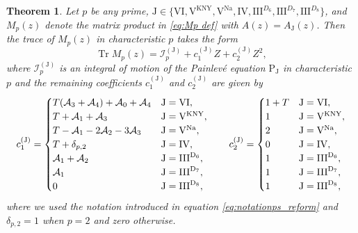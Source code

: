 \documentclass[a4paper,reqno]{amsart}
\numberwithin{equation}{section}
\newtheorem{theorem}{Theorem}[section]
\numberwithin{figure}{section}
\theoremstyle{remark}
\newcommand\PJ{\textrm{P}_{\textrm{J}}}
\begin{document}
\begin{theorem}\label{thm:gen trace}
Let $p$ be any prime, $\textrm{J}\in\{\textrm{VI},\textrm{V}^\text{KNY},\textrm{V}^\text{Na},\textrm{IV},\textrm{III}^{D_6},\textrm{III}^{D_7},\textrm{III}^{D_8}\}$, and $M_p(z)$ denote the matrix product in \eqref{eq:Mp def} with $A(z)=A_\textrm{J}(z)$. Then the trace of $M_p(z)$ in characteristic $p$ takes the form
\begin{equation}\label{eq:chipform}
   \operatorname{Tr} M_p(z)=\mathcal{I}^{(\textrm{J})}_p+c_1^{(\textrm{J})}Z+c_2^{(\textrm{J})}Z^2,
\end{equation}
where $\mathcal{I}_p^{(\textrm{J})}$ is an integral of motion of the Painlev\'e equation $\PJ$ in characteristic $p$ and the remaining coefficients $c_1^{(\textrm{J})}$ and $c_2^{(\textrm{J})}$ are given by
\begin{equation*}
    c_1^{(\textrm{J})} = \begin{cases} T(\mathcal{A}_3+\mathcal{A}_4)+\mathcal{A}_0+\mathcal{A}_4 & \textrm{J} = \rm{VI}, \\
 T+\mathcal{A}_1+\mathcal{A}_3 & \textrm{J} = \rm{V}^\text{\upshape KNY}, \\
  T-\mathcal{A}_1-2\mathcal{A}_2-3\mathcal{A}_3 & \textrm{J} = \rm{V}^\text{\upshape Na}, \\
 T+\delta_{p,2} & \textrm{J} = \rm{IV}, \\
\mathcal{A}_1+\mathcal{A}_2 & \textrm{J} = \rm{III}^{D_6}, \\
\mathcal{A}_1 & \textrm{J} = \rm{III}^{D_7}, \\
0 & \textrm{J}= \rm{III}^{D_8}, \\
    \end{cases}
    \qquad
        c_2^{(\textrm{J})} = \begin{cases} 1+T & \textrm{J} = \rm{VI}, \\
 1& \textrm{J} = \rm{V}^\text{\upshape KNY}, \\
  2& \textrm{J} = \rm{V}^\text{\upshape Na}, \\
 0 & \textrm{J} = \rm{IV}, \\
1 & \textrm{J} = \rm{III}^{D_6}, \\
1 & \textrm{J} = \rm{III}^{D_7}, \\
1 & \textrm{J}= \rm{III}^{D_8}, \\
    \end{cases}
\end{equation*}
where we used the notation introduced in equation \eqref{eq:notationps_reform} and $\delta_{p,2}=1$ when $p=2$ and zero otherwise.
\end{theorem}
\end{document}
